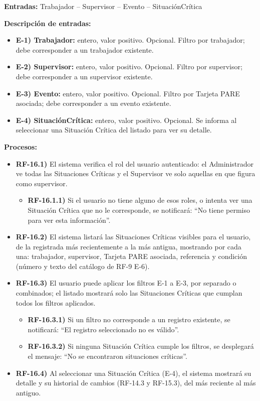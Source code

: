 \textbf{Entradas:} Trabajador -- Supervisor -- Evento -- Situaci\'onCr\'itica

\textbf{Descripci\'on de entradas:}
\begin{itemize}[label={}, leftmargin=1.5em]
  \item \textbf{E-1) Trabajador:} entero, valor positivo. Opcional. Filtro por trabajador; debe corresponder a un trabajador existente.
  \item \textbf{E-2) Supervisor:} entero, valor positivo. Opcional. Filtro por supervisor; debe corresponder a un supervisor existente.
  \item \textbf{E-3) Evento:} entero, valor positivo. Opcional. Filtro por Tarjeta PARE asociada; debe corresponder a un evento existente.
  \item \textbf{E-4) Situaci\'onCr\'itica:} entero, valor positivo. Opcional. Se informa al seleccionar una Situaci\'on Cr\'itica del listado para ver su detalle.
\end{itemize}

\textbf{Procesos:}
\begin{itemize}[label={}, leftmargin=1.5em]
  \item \textbf{RF-16.1)} El sistema verifica el rol del usuario autenticado: el Administrador ve todas las Situaciones Cr\'iticas y el Supervisor ve solo aquellas en que figura como supervisor.
  \begin{itemize}[label={}, leftmargin=1.5em]
    \item \textbf{RF-16.1.1)} Si el usuario no tiene alguno de esos roles, o intenta ver una Situaci\'on Cr\'itica que no le corresponde, se notificar\'a: ``No tiene permiso para ver esta informaci\'on''.
  \end{itemize}
  \item \textbf{RF-16.2)} El sistema listar\'a las Situaciones Cr\'iticas visibles para el usuario, de la registrada m\'as recientemente a la m\'as antigua, mostrando por cada una: trabajador, supervisor, Tarjeta PARE asociada, referencia y condici\'on (n\'umero y texto del cat\'alogo de RF-9 E-6).
  \item \textbf{RF-16.3)} El usuario puede aplicar los filtros E-1 a E-3, por separado o combinados; el listado mostrar\'a solo las Situaciones Cr\'iticas que cumplan todos los filtros aplicados.
  \begin{itemize}[label={}, leftmargin=1.5em]
    \item \textbf{RF-16.3.1)} Si un filtro no corresponde a un registro existente, se notificar\'a: ``El registro seleccionado no es v\'alido''.
    \item \textbf{RF-16.3.2)} Si ninguna Situaci\'on Cr\'itica cumple los filtros, se desplegar\'a el mensaje: ``No se encontraron situaciones cr\'iticas''.
  \end{itemize}
  \item \textbf{RF-16.4)} Al seleccionar una Situaci\'on Cr\'itica (E-4), el sistema mostrar\'a su detalle y su historial de cambios (RF-14.3 y RF-15.3), del m\'as reciente al m\'as antiguo.
\end{itemize}

